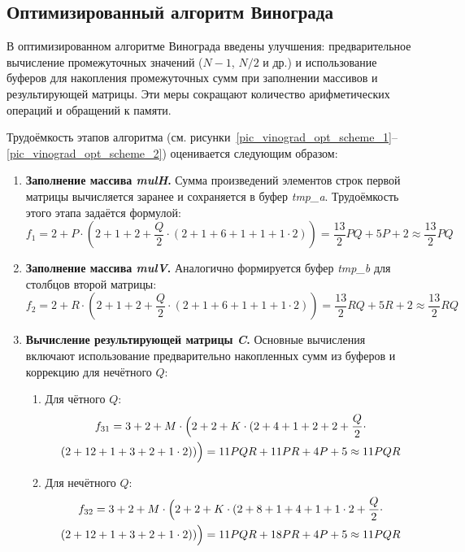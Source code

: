 \subsection{Оптимизированный алгоритм Винограда}

В оптимизированном алгоритме Винограда введены улучшения: предварительное вычисление промежуточных значений ($N-1$, $N/2$ и др.) и использование буферов для накопления промежуточных сумм при заполнении массивов и результирующей матрицы. Эти меры сокращают количество арифметических операций и обращений к памяти.

Трудоёмкость этапов алгоритма (см. рисунки~\ref{pic_vinograd_opt_scheme_1}--\ref{pic_vinograd_opt_scheme_2}) оценивается следующим образом:

\begin{enumerate}
	\item \textbf{Заполнение массива \textit{mulH}.}  
	Сумма произведений элементов строк первой матрицы вычисляется заранее и сохраняется в буфер \textit{tmp\_a}. Трудоёмкость этого этапа задаётся формулой:
	\begin{equation}
		f_1 = 2 + P \cdot \left(2 + 1 + 2 + \frac{Q}{2} \cdot (2 + 1 + 6 + 1 + 1 + 1 \cdot 2) \right) 
		= \frac{13}{2} P Q + 5 P + 2 \approx \frac{13}{2} P Q
	\end{equation}
	
	\item \textbf{Заполнение массива \textit{mulV}.}  
	Аналогично формируется буфер \textit{tmp\_b} для столбцов второй матрицы:
	\begin{equation}
		f_2 = 2 + R \cdot \left(2 + 1 + 2 + \frac{Q}{2} \cdot (2 + 1 + 6 + 1 + 1 + 1 \cdot 2) \right)
		= \frac{13}{2} R Q + 5 R + 2 \approx \frac{13}{2} R Q
	\end{equation}
	
	\item \textbf{Вычисление результирующей матрицы \textit{C}.}  
	Основные вычисления включают использование предварительно накопленных сумм из буферов и коррекцию для нечётного $Q$:
	
	\begin{enumerate}
		\item Для чётного $Q$:
		\begin{multline}
			f_{31} = 3 + 2 + M \cdot \Bigl(2 + 2 + K \cdot (2 + 4 + 1 + 2 + 2 + \frac{Q}{2} \cdot \\
			(2 + 12 + 1 + 3 + 2 + 1 \cdot 2)) \Bigr) 
			= 11 P Q R + 11 P R + 4 P + 5 \approx 11 P Q R
		\end{multline}
		
		\item Для нечётного $Q$:
		\begin{multline}
			f_{32} = 3 + 2 + M \cdot \Bigl(2 + 2 + K \cdot (2 + 8 + 1 + 4 + 1 + 1 \cdot 2 + \frac{Q}{2} \cdot \\
			(2 + 12 + 1 + 3 + 2 + 1 \cdot 2)) \Bigr) 
			= 11 P Q R + 18 P R + 4 P + 5 \approx 11 P Q R
		\end{multline}
	\end{enumerate}
\end{enumerate}

